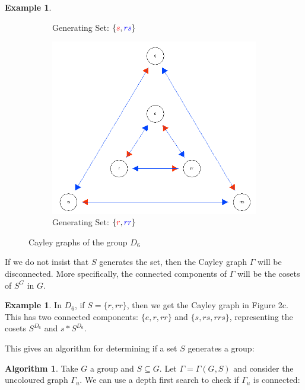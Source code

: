 \documentclass[10pt]{article}
\theoremstyle{plain}
\theoremstyle{definition}
\newtheorem{example}[theorem]{Example}
\theoremstyle{definition}
\newtheorem{algorithm}[theorem]{Algorithm}
\theoremstyle{definition}
\begin{document}
\begin{multicols}{2}
\begin{example}
\begin{figure}[t]
\begin{subfigure}{.3\textwidth}
			\caption{Generating Set: $\{ \textcolor{red}{s}, \textcolor{blue}{rs} \}$}
			\label{fig2:sub2}
		\end{subfigure}
		\begin{subfigure}{.3\textwidth}
			\includegraphics[scale = 0.3]{D6_gen3}
			\caption{Generating Set: $\{ \textcolor{red}{r}, \textcolor{blue}{rr} \}$}
			\label{fig2:sub3}
		\end{subfigure}
		\caption{Cayley graphs of the group $D_6$}
	\end{figure}
\end{example}

If we do not insist that $S$ generates the set, then the Cayley graph $\Gamma$ will be disconnected. More specifically, the connected components of $\Gamma$ will be the cosets of $S^G$ in $G$. 

\begin{example}
	In $D_6$, if $S = \{ r, rr \}$, then we get the Cayley graph in Figure 2c. This has two connected components: $\{ e, r, rr \}$ and $\{ s, rs, rrs \}$, representing the cosets $S^{D_6}$ and $s*S^{D_6}$.
\end{example}

This gives an algorithm for determining if a set $S$ generates a group:

\begin{algorithm}
	Take $G$ a group and $S \subseteq G$. Let $\Gamma = \Gamma(G, S)$ and consider the uncoloured graph $\Gamma_u$. We can use a depth first search to check if $\Gamma_u$ is connected:


\end{algorithm}
\end{multicols}
\end{document}
